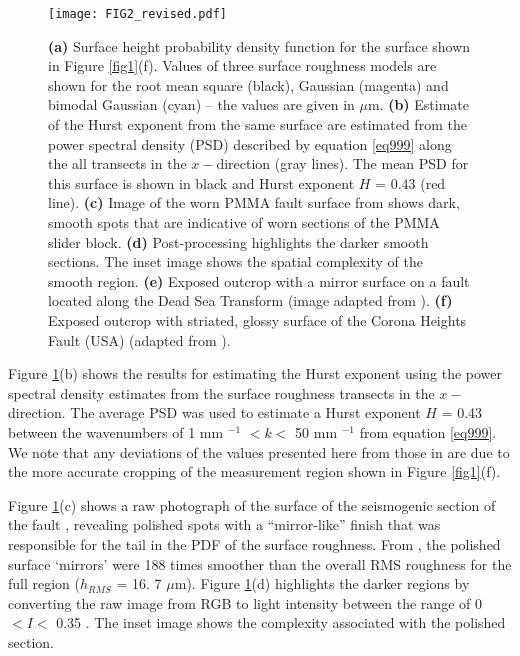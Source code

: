\documentclass[preprint,1p, 10pt,authoryear]{elsarticle}
\begin{document}
\begin{figure}
	\centering
	\texttt{[image: FIG2\_revised.pdf]} 
	\caption{\textbf{(a)} Surface height probability density function for the surface shown in Figure \ref{fig1}(f). Values of three surface roughness models are shown for the root mean square (black), Gaussian (magenta) and bimodal Gaussian (cyan) -- the values are given in $\mu$m. \textbf{(b)} Estimate of the Hurst exponent from the same surface are estimated from the power spectral density (PSD) described by equation \eqref{eq999} along the all transects in the $x-$direction (gray lines). The mean PSD for this surface is shown in black and Hurst exponent $H$ = 0.43 (red line). \textbf{(c)} Image of the worn PMMA fault surface from \citep{Selvadurai2015b} shows dark, smooth spots that are indicative of worn sections of the PMMA slider block. \textbf{(d)} Post-processing highlights the darker smooth sections. The inset image shows the spatial complexity of the smooth region. \textbf{(e)} Exposed outcrop with a mirror surface on a fault located along the Dead Sea Transform (image adapted from \citet{Goldberg2016}).  \textbf{(f)} Exposed outcrop with striated, glossy surface of the Corona Heights Fault (USA) (adapted from \citet{Verberne2019}).}
	\label{fig2}
\end{figure}
Figure \ref{fig2}(b) shows the results for estimating the Hurst exponent using the power spectral density estimates from the surface roughness transects in the $x-$direction. The average PSD was used to estimate a Hurst exponent $H$ = 0.43 between the wavenumbers of 1 mm $^{-1}$  $<k<$  50 mm $^{-1}$ from equation \eqref{eq999}. We note that any deviations of the values presented here from those in \citet{Selvadurai2017} are due to the more accurate cropping of the measurement region shown in Figure \ref{fig1}(f). 

Figure \ref{fig2}(c) shows a raw photograph of the surface of the seismogenic section of the fault \citep{Selvadurai2017}, revealing polished spots with a ``mirror-like'' finish that was responsible for the tail in the PDF of the surface roughness. From \citet{Selvadurai2017}, the polished surface `mirrors' were 188 times smoother than the overall RMS roughness for the full region ($h_{RMS}$ = 16. 7 $\mu$m). Figure \ref{fig2}(d) highlights the darker regions by converting the raw image from RGB to light intensity between the range of 0 $< I <$ 0.35 \citep{Gonzalez2009}. The inset image shows the complexity associated with the polished section.
\end{document}
